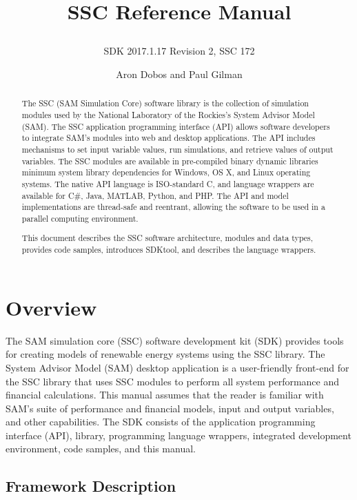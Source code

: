 \documentclass{scrartcl} %
\title{SSC Reference Manual
\subtitle{SDK 2017.1.17 Revision 2, SSC 172}}
\author{Aron Dobos and Paul Gilman}
\newcommand{\+}{\discretionary{\mbox{\scriptsize$\hookleftarrow$}}{}{}}
\begin{document}
\maketitle
\vspace{2.5in}
\begin{abstract}
The SSC (SAM Simulation Core) software library is the collection of simulation modules used by the National Laboratory of the Rockies's  System Advisor Model (SAM).  The SSC application programming interface (API) allows software developers to integrate SAM's modules into web and desktop applications. The API includes mechanisms to set input variable values, run simulations, and retrieve values of output variables. The SSC modules are available in pre-compiled binary dynamic libraries minimum system library dependencies for Windows, OS X, and Linux operating systems. The native API language is ISO-standard C, and language wrappers are available for C\#, Java, MATLAB, Python, and PHP. The API and model implementations are thread-safe and reentrant, allowing the software to be used in a parallel computing environment.

This document describes the SSC software architecture, modules and data types, provides code samples, introduces SDKtool, and describes the language wrappers.
\end{abstract} 

\newpage
\tableofcontents
\newpage

\section{Overview}
\label{sec_overview}

The SAM simulation core (SSC) software development kit (SDK) provides tools for creating models of renewable energy systems using the SSC library. The System Advisor Model (SAM) desktop application is a user-friendly front-end for the SSC library that uses SSC modules to perform all system performance and financial calculations. This manual assumes that the reader is familiar with SAM's suite of performance and financial models, input and output variables, and other capabilities. The SDK consists of the application programming interface (API), library, programming language wrappers, integrated development environment, code samples, and this manual.

\subsection{Framework Description}
\end{document}
